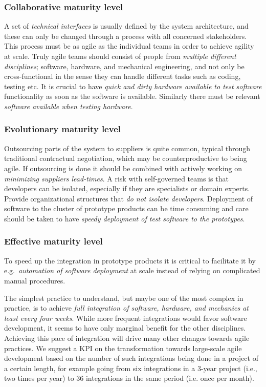 \documentclass[10pt,a4paper]{IEEEtran} %
\begin{document}
\subsubsection{Collaborative maturity level}
A set of \emph{technical interfaces} is usually defined by the system architecture, and these can only be changed through a process with all concerned stakeholders. This process must be as agile as the individual teams in order to achieve agility at scale.
Truly agile teams should consist of people from \emph{multiple different disciplines}; software, hardware, and mechanical engineering, and not only be cross-functional in the
sense they can handle different tasks such as coding, testing etc.
%
It is crucial to have \emph{quick and dirty hardware available to test software} functionality as soon as the software is available. Similarly there must be relevant \emph{software available when testing hardware}.

\subsubsection{Evolutionary maturity level}
Outsourcing parts of the system to suppliers is quite common, typical through traditional contractual negotiation, which may be counterproductive to being agile. If outsourcing is done it should be combined with actively working on \emph{minimizing suppliers lead-times}. 
A risk with self-governed teams is that developers can be isolated, especially if they are specialists or domain experts. Provide organizational structures that \emph{do not isolate developers}.
Deployment of software to the cluster of prototype products can be time consuming and care should be taken to have \emph{speedy deployment of test software to the prototypes}.

\subsubsection{Effective maturity level}
To speed up the integration in prototype products it is critical to facilitate it by e.g.~\emph{automation of software deployment} at scale instead of relying on complicated
manual procedures.

The simplest practice to understand, but maybe one of the most complex in practice, is to achieve \emph{full integration of software, hardware, and mechanics at least every four weeks}.
While more frequent integrations would favor software development, it seems to have only marginal benefit for the other disciplines. 
Achieving this pace of integration will drive many other changes towards agile practices.
We suggest a KPI on the transformation towards large-scale agile development based on the number of such integrations being done in a project of a certain length, for example going from six integrations in a 3-year project (i.e., two times per year) to 36 integrations in the same period (i.e. once per month).
\end{document}
